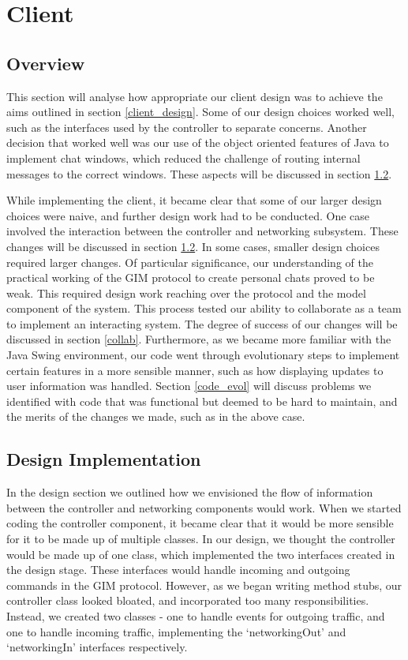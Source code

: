\section{Client}

\subsection{Overview}

This section will analyse how appropriate our client design was to achieve the aims outlined in section \ref{client_design}. Some of our design choices worked well, such as the interfaces used by the controller to separate concerns. Another decision that worked well was our use of the object oriented features of Java to implement chat windows, which reduced the challenge of routing internal messages to the correct windows. These aspects will be discussed in section \ref{designimpl}.

While implementing the client, it became clear that some of our larger design choices were naive, and further design work had to be conducted. One case involved the interaction between the controller and networking subsystem. These changes will be discussed in section \ref{designimpl}. In some cases, smaller design choices required larger changes. Of particular significance, our understanding of the practical working of the GIM protocol to create personal chats proved to be weak. This required design work reaching over the protocol and the model component of the system. This process tested our ability to collaborate as a team to implement an interacting system. The degree of success of our changes will be discussed in section \ref{collab}. Furthermore, as we became more familiar with the Java Swing environment, our code went through evolutionary steps to implement certain features in a more sensible manner, such as how displaying updates to user information was handled. Section \ref{code_evol} will discuss problems we identified with code that was functional but deemed to be hard to maintain, and the merits of the changes we made, such as in the above case.

\subsection{Design Implementation}
\label{designimpl}

In the design section we outlined how we envisioned the flow of information between the controller and networking components would work. When we started coding the controller component, it became clear that it would be more sensible for it to be made up of multiple classes. In our design, we thought the controller would be made up of one class, which implemented the two interfaces created in the design stage. These interfaces would handle incoming and outgoing commands in the GIM protocol. However, as we began writing method stubs, our controller class looked bloated, and incorporated too many responsibilities. Instead, we created two classes - one to handle events for outgoing traffic, and one to handle incoming traffic, implementing the `networkingOut' and `networkingIn' interfaces respectively.

